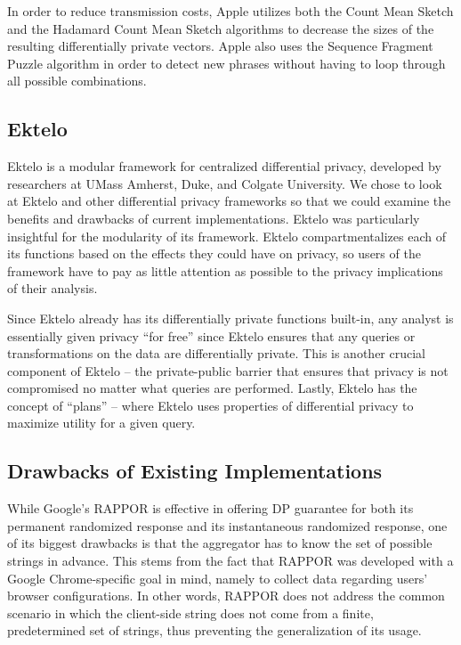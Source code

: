 \documentclass[12pt]{article}
\theoremstyle{definition}
\begin{document}
\bigskip

In order to reduce transmission costs, Apple utilizes both the Count Mean Sketch and the Hadamard Count Mean Sketch algorithms to decrease the sizes of the resulting differentially private vectors. Apple also uses the Sequence Fragment Puzzle algorithm in order to detect new phrases without having to loop through all possible combinations.

\subsection{Ektelo}

\noindent

Ektelo is a modular framework for centralized differential privacy, developed by researchers at UMass Amherst, Duke, and Colgate University. We chose to look at Ektelo and other differential privacy frameworks so that we could examine the benefits and drawbacks of current implementations. Ektelo was particularly insightful for the modularity of its framework. Ektelo compartmentalizes each of its functions based on the effects they could have on privacy, so users of the framework have to pay as little attention as possible to the privacy implications of their analysis.

\bigskip

Since Ektelo already has its differentially private functions built-in, any analyst is essentially given privacy ``for free'' since Ektelo ensures that any queries or transformations on the data are differentially private. This is another crucial component of Ektelo -- the private-public barrier that ensures that privacy is not compromised no matter what queries are performed. Lastly, Ektelo has the concept of ``plans'' -- where Ektelo uses properties of differential privacy to maximize utility for a given query.

\subsection{Drawbacks of Existing Implementations}

\noindent

While Google's RAPPOR is effective in offering DP guarantee for both its
permanent randomized response and its instantaneous randomized response, one of
its biggest drawbacks is that the aggregator has to know the set of possible
strings in advance. This stems from the fact that RAPPOR was developed with a
Google Chrome-specific goal in mind, namely to collect data regarding users'
browser configurations. In other words, RAPPOR does not address the
common scenario in which the client-side string does not come from a finite,
predetermined set of strings, thus preventing the generalization of its usage.
\end{document}
